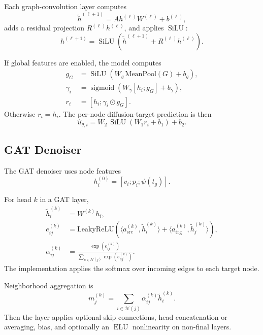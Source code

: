 \documentclass[11pt]{article}
\newcommand{\sigmoid}{\operatorname{sigmoid}}
\newcommand{\SiLU}{\operatorname{SiLU}}
\newcommand{\ELU}{\operatorname{ELU}}
\begin{document}
Each graph-convolution layer computes
\begin{equation}
\tilde{h}^{(\ell+1)} = A h^{(\ell)} W^{(\ell)} + b^{(\ell)},
\end{equation}
adds a residual projection $R^{(\ell)} h^{(\ell)}$, and applies $\SiLU$:
\begin{equation}
h^{(\ell+1)} = \SiLU\!\left(\tilde{h}^{(\ell+1)} + R^{(\ell)} h^{(\ell)}\right).
\end{equation}

If global features are enabled, the model computes
\begin{align}
g_G &= \SiLU\!\left(W_g\,\mathrm{MeanPool}(G) + b_g\right), \\
\gamma_i &= \sigmoid\!\left(W_\gamma [h_i ; g_G] + b_\gamma\right), \\
r_i &= [h_i ; \gamma_i \odot g_G].
\end{align}
Otherwise $r_i = h_i$. The per-node diffusion-target prediction is then
\begin{equation}
\hat{u}_{\theta,i}
=
W_2\,\SiLU(W_1 r_i + b_1) + b_2.
\end{equation}

\subsection{GAT Denoiser}
The GAT denoiser uses node features
\begin{equation}
h_i^{(0)} = [v_i ; p_i ; \psi(t_g)].
\end{equation}

For head $k$ in a GAT layer,
\begin{align}
\tilde{h}_i^{(k)} &= W^{(k)} h_i, \\
e_{ij}^{(k)} &=
\mathrm{LeakyReLU}\!\left(
\langle a_{\mathrm{src}}^{(k)}, \tilde{h}_i^{(k)} \rangle
+
\langle a_{\mathrm{trg}}^{(k)}, \tilde{h}_j^{(k)} \rangle
\right), \\
\alpha_{ij}^{(k)}
&=
\frac{\exp(e_{ij}^{(k)})}
{\sum\limits_{u \in \mathcal{N}(j)} \exp(e_{uj}^{(k)})}.
\end{align}
The implementation applies the softmax over incoming edges to each target node.

Neighborhood aggregation is
\begin{equation}
m_j^{(k)} = \sum_{i \in \mathcal{N}(j)} \alpha_{ij}^{(k)} \tilde{h}_i^{(k)}.
\end{equation}
Then the layer applies optional skip connections, head concatenation or averaging, bias, and optionally an $\ELU$ nonlinearity on non-final layers.
\end{document}
